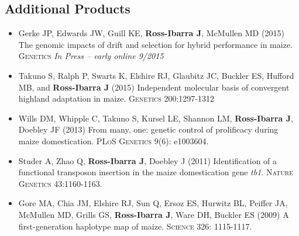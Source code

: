 \subsection*{Additional Products}

\begin{itemize} \setlength{\itemsep}{0pt} \setlength{\parskip}{2pt} \setlength{\parsep}{0pt}

\item Gerke JP, Edwards JW, Guill KE, {\bf Ross-Ibarra J}, McMullen MD (2015) The genomic impacts of drift and selection for hybrid performance in maize. \textsc{Genetics} \emph{In Press -- early online 9/2015}

\item Takuno S, Ralph P, Swarts K, Elshire RJ, Glaubitz JC, Buckler ES, Hufford MB, and {\bf Ross-Ibarra J} (2015) Independent molecular basis of convergent highland adaptation in maize. \textsc{Genetics} 200:1297-1312

\item Wills DM, Whipple C, Takuno S, Kursel LE, Shannon LM, {\bf Ross-Ibarra J}, Doebley JF (2013) From many, one: genetic control of prolificacy during maize domestication. \textsc{PLoS Genetics} 9(6): e1003604. 

\item Studer A, Zhao Q, {\bf Ross-Ibarra J}, Doebley J (2011) Identification of a functional transposon insertion in the maize domestication gene \emph{tb1}.  \textsc{Nature Genetics} 43:1160-1163.






\item Gore MA, Chia JM, Elshire RJ, Sun Q, Ersoz ES, Hurwitz BL, Peiffer JA, McMullen MD, Grills GS, {\bf Ross-Ibarra J}, Ware DH, Buckler ES (2009) A first-generation haplotype map of maize.  \textsc{Science 326}: 1115-1117.

\end{itemize}

